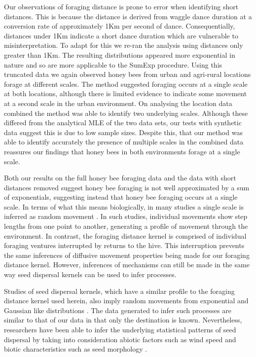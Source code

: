 \documentclass[11pt,usenames,dvipsnames]{article}
\begin{document}
Our observations of foraging distance is prone to error when identifying short distances. This is because the distance is derived from waggle dance duration at a conversion rate of approximately 1Km per second of dance. Consequentially, distances under 1Km indicate a short dance duration which are vulnerable to misinterpretation. To adapt for this we re-ran the analysis using distances only greater than 1Km. The resulting distributions appeared more exponential in nature and so are more applicable to the SumExp procedure. Using this truncated data we again observed honey bees from urban and agri-rural locations forage at different scales. The method suggested foraging occurs at a single scale at both locations, although there is limited evidence to indicate some movement at a second scale in the urban environment. On analysing the location data combined the method was able to identify two underlying scales. Although these differed from the analytical MLE of the two data sets, our tests with synthetic data suggest this is due to low sample sizes. Despite this, that our method was able to identify accurately the presence of multiple scales in the combined data reassures our findings that honey bees in both environments forage at a single scale. 

Both our results on the full honey bee foraging data and the data with short distances removed suggest honey bee foraging is not well approximated by a sum of exponentials, suggesting instead that honey bee foraging occurs at a single scale. In terms of what this means biologically, in many studies a single scale is inferred as random movement \citep{Wosniack2017, Sakamoto2017, Zhao2016}. In such studies, individual movements show step lengths from one point to another, generating a profile of movement through the environment. In contrast, the foraging distance kernel is comprised of individual foraging ventures interrupted by returns to the hive. This interruption prevents the same inferences of diffusive movement properties being made for our foraging distance kernel. However, inferences of mechanisms can still be made in the same way seed dispersal kernels can be used to infer processes.

Studies of seed dispersal kernels, which have a similar profile to the foraging distance kernel used herein, also imply random movements from exponential and Gaussian like distributions \citep{Bullock2017}. The data generated to infer such processes are similar to that of our data in that only the destination is known. Nevertheless, researchers have been able to infer the underlying statistical patterns of seed dispersal by taking into consideration abiotic factors such as wind speed and biotic characteristics such as seed morphology \citep{Levin2003}.
\end{document}
